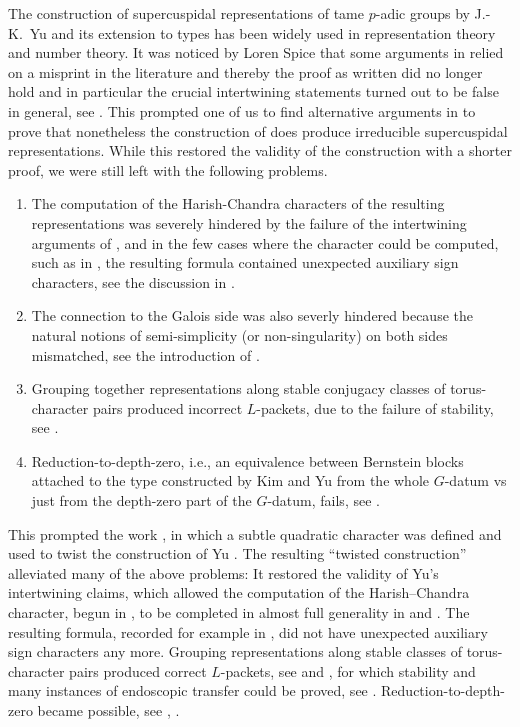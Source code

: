 \documentclass{article}
\theoremstyle{definition}
\numberwithin{equation}{subsection}
\renewcommand{\-}{\hyp{}}
\begin{document}
The construction \cite{Yu01} of supercuspidal representations of tame $p$-adic groups by J.-K.~Yu and its extension \cite{KimYu} to types has been widely used in representation theory and number theory. It was noticed by Loren Spice that some arguments in \cite{Yu01} relied on a misprint in the literature and thereby the proof as written did no longer hold and in particular the crucial intertwining statements \cite[Proposition 14.1 and Theorem 14.2]{Yu01} turned out to be false in general, see \cite[\S4]{Fin21Comp}. This prompted one of us to find alternative arguments in \cite{Fin21Comp} to prove that nonetheless the construction of \cite{Yu01} does produce irreducible supercuspidal representations. While this restored the validity of the construction with a shorter proof, we were still left with the following problems.   \begin{enumerate}
	\item The computation of the Harish-Chandra characters of the resulting representations was severely hindered by the failure of the intertwining arguments of \cite{Yu01}, and in the few cases where the character could be computed, such as in \cite{AS09}, the resulting formula contained unexpected auxiliary sign characters, see the discussion in \cite[\S4.2]{KalRSP}.
	\item The connection to the Galois side was also severly hindered because the natural notions of semi-simplicity (or non-singularity) on both sides mismatched, see the introduction of \cite{KalSLP}.
	\item Grouping together representations along stable conjugacy classes of torus-character pairs produced incorrect $L$-packets, due to the failure of stability, see \cite{DS18}.
	\item Reduction-to-depth-zero, i.e., an equivalence between Bernstein blocks attached to the type constructed by Kim and Yu from the whole $G$-datum vs just from the depth-zero part of the $G$-datum, fails, see \cite[Appendix~A.2]{AFMO2}.
\end{enumerate}

This prompted the work \cite{FKS23}, in which a subtle quadratic character was defined and used to twist the construction of Yu \cite{Yu01}. The resulting ``twisted construction'' alleviated many of the above problems: It restored the validity of Yu's intertwining claims, which allowed the computation of the Harish--Chandra character, begun in \cite{AS09}, to be completed in almost full generality in \cite{Spice18} and \cite{Spice21}. The resulting formula, recorded for example in \cite[Theorem 4.3.5]{FKS23}, did not have unexpected auxiliary sign characters any more. Grouping representations along stable classes of torus-character pairs produced correct $L$-packets, see \cite{KalRSP} and \cite{KalSLP}, for which stability and many instances of endoscopic transfer could be proved, see \cite[\S4.4]{FKS23}. Reduction-to-depth-zero became possible, see \cite{AFMO2}, \cite{DF}.
\end{document}
